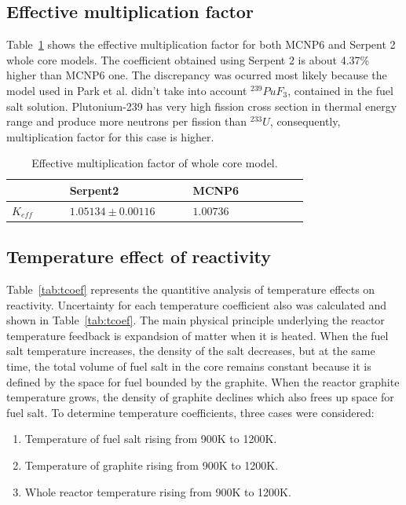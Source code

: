 \documentclass{anstrans}
\begin{document}
\subsection{Effective multiplication factor}
Table~\ref{tab:keff} shows the effective multiplication factor for both MCNP6 and Serpent 2 whole core models. The coefficient obtained using Serpent 2 is about 4.37\% higher than MCNP6 one. The discrepancy was ocurred most likely because the model used in Park et al. didn't take into account $^{239}PuF_3$, contained in the fuel salt solution. Plutonium-239 has very high fission cross section in thermal energy range and produce more neutrons per fission than $^{233}U$, consequently, multiplication factor for this case is higher.
\captionsetup[table]{
  labelsep = newline,
  name = TABLE, 
  justification=justified,
  singlelinecheck=false,%
  labelsep=colon,%
  skip = \medskipamount}
\begin{table}[h!]
\begin{tabular}{p{0.15\linewidth} p{0.3\linewidth} p{0.3\linewidth}} \toprule
      & Serpent2      & MCNP6 \cite{park_whole_2015}          
\\ \midrule
$K_{eff}$  & $1.05134\pm0.00116$ & $1.00736$
\\
\bottomrule
\end{tabular}
  \caption{Effective multiplication factor of whole core model.}
  \label{tab:keff}
\end{table}
\subsection{Temperature effect of reactivity}
Table~\ref{tab:tcoef} represents the quantitive analysis of temperature effects on reactivity. Uncertainty for each temperature coefficient also was calculated and shown in Table~\ref{tab:tcoef}. The main physical principle underlying the reactor temperature feedback is expandsion of matter when it is heated. When the fuel salt temperature increases, the density of the salt decreases, but at the same time, the total volume of fuel salt in the core remains constant because it is defined by the space for fuel bounded by the graphite. When the reactor graphite temperature grows, the density of graphite declines which also frees up space for fuel salt. To determine temperature coefficients, three cases were considered:
\begin{enumerate}  
\item Temperature of fuel salt rising from 900K to 1200K.
\item Temperature of graphite rising from 900K to 1200K. 
\item Whole reactor temperature rising from 900K to 1200K.
\end{enumerate}
\end{document}
